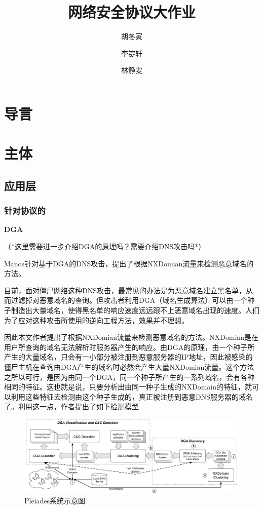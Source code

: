 \documentclass[12pt]{article} %
\title{网络安全协议大作业}
\author{胡冬寅 \and 李锭轩 \and 林静雯}
\date{} %
\begin{document}
\maketitle

\section{导言}

\section{主体}
\label{main}

\subsection{应用层}
\label{app}

\subsubsection{针对协议的}
\label{protocol}

\textbf{DGA}

（*这里需要进一步介绍DGA的原理吗？需要介绍DNS攻击吗*）

Manos针对基于DGA的DNS攻击，提出了根据NXDomian流量来检测恶意域名的方法。

目前，面对僵尸网络这种DNS攻击，最常见的办法是为恶意域名建立黑名单，从而过滤掉对恶意域名的查询。但攻击者利用DGA（域名生成算法）可以由一个种子制造出大量域名，使得黑名单的响应速度远远跟不上恶意域名出现的速度。人们为了应对这种攻击所使用的逆向工程方法，效果并不理想。

因此本文作者提出了根据NXDomian流量来检测恶意域名的方法。NXDomian是在用户所查询的域名无法解析时服务器产生的响应。由DGA的原理，由一个种子所产生的大量域名，只会有一小部分被注册到恶意服务器的IP地址，因此被感染的僵尸主机在查询由DGA产生的域名时必然会产生大量NXDomian流量。这个方法之所以可行，是因为由同一个DGA，同一个种子所产生的一系列域名，会有各种相同的特征。这也就是说，只要分析出由同一种子生成的NXDomain的特征，就可以利用这些特征去检测由这个种子生成的，真正被注册到恶意DNS服务器的域名了。利用这一点，作者提出了如下检测模型

\begin{figure}
	\caption{Pleiades系统示意图}
	\label{dga_pic}
	\includegraphics[width = \linewidth]{./pics/dga}
\end{figure}
\end{document}
